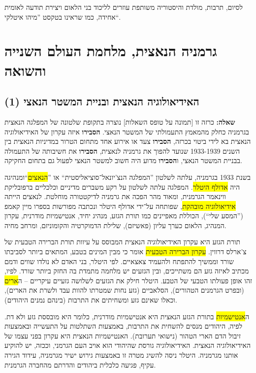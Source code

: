 \documentclass[a4paper]{article}
\newcommand\hl[1]   {\colorbox{yellow}{\!\!#1\!\!}}
\begin{document}
\begin{enumerate}[A.]
			לסיום, תרבות, מולדת והיסטוריה משותפת עוזרים לליכוד בני הלאום ויצירת תודעה לאומית אחידה, כמו שראינו בטקסט ''מיהו איטלקי``. 
			
		\end{enumerate}
	
	
	\section{גרמניה הנאצית, מלחמת העולם השנייה והשואה}
	\subsection{האידיאולוגיה הנאצית ובניית המשטר הנאצי (1)}
	\textbf{שאלה: }כרזה זו [תמונה על טופס השאלות] נוצרה בתקופת שלטונה של המפלגה הנאצית בגרמניה כחלק מהמאמץ התעמולתי של המשטר הנאצי. \textbf{הסבירו} איזה עקרון של האידיאולוגיה הנאצית בא לידי ביטוי בכרזה, \textbf{הסבירו} צעד או אירוע אחד מתחום הטרור במדיניות הנאצית בין השנים 1933-1939 שנועד להפוך את גרמניה לנאצית, \textbf{הסבירו} את חשיבותה של התעמולה בבניית המשטר הנאצי, ו\textbf{הסבירו} מדוע היה חשוב למשטר הנאצי לפעול גם בתחום החקיקה. 
	
	בשנת 1933 בגרמניה, עלתה לשלטון ''המפלגה הנצ'יונאל־סוציאליסטית`` או ''\hl{הנאצים}``ומנהיגה היה \hl{אדולף היטלר}. המפלגה עלתה לשלטון על רקע משברים מדיניים וכלכליים ברפובליקת ווינאמר הגרמנית, ומאוד מהר הפכה את גרמניה לדיקטטורה מוחלטת. לנאצים הייתה \hl{אידיאולוגיה מובהקת}, שפותחה על־ידי אדולף היטלר ונכתבה מפורשות בספרו מיין קאמפ (''המסע שלי``), הכוללת מאפיינים כמו תורת הגזע, מנהיג יחיד, אנטישמיות מודרנית, עקרון המנהיג, הלאום כערך עליון (פאשיזם), שלילת הדמוקרטיה והקומוניזם, ומרחב מחיה. 
	
	תורת הגזע היא עקרון האידיאולוגיה הנאצית המבוסס על עיוות תורת הברירה הטבעית של צ'ארלס דרווין. \hl{עקרון הברירה הטבעית} אומר כי מבין המינים בטבע, המתאים ביותר לסביבתו שורד וממשיך להתפתח ולהעמיד צאצאיים. לפי היטלר, בני האדם לא נולדו שווים ודמם מכתיב לאיזה גזע הם משתייכים, ובין הגזעים יש מלחמה מתמדת בה החזק ביותר שורד. לפיו, זהו אופן פעולתו הטבעי של הטבע. היטלר חילק את הגזעים לשלושה גזעיים עיקריים – ה\hl{ארים} (ובפרט הגרמנים הטהורים), הסלאביים (גזע נחות שמטרתו להוות עבד ולשרת את הארים), וכאלו שאינם גזע ומשחיתים את התרבות (בינהם נמנים היהודים). 
	
	ה\hl{אנטישמיות} בתורת הגזע הנאצית היא אנטישמיות מודרנית, כלומר היא מובססת גזע ולא דת. לפיה, היהודים מנסים להשחית את התרבות, באמצעות השתלטות על התעשייה ובאמצעות זיבול הדם הארי הטהור (נישואי תערובת). האנטישמיות הנאצית היא עקרון בפני עצמו של האידיאולוגיה הנאצית. האידיאולוגיה גורסת שהיהודי הוא אויב העם הגרמני, וככזה, יש להוקיע אותנו מגרמניה. היטלר ניסה להשיג מטרה זו באמצעות גירוש ישיר מגרמניה, עידוד הגירה עקיף, פגיעה כלכלית ביהודים והדרתם מהחברה הגרמנית. 
	
\end{document}

